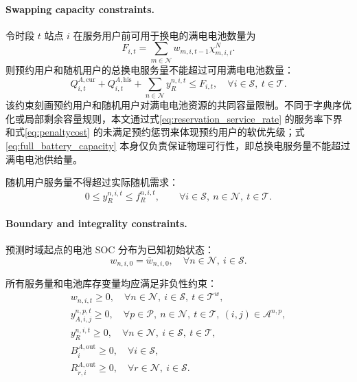 \documentclass[12pt,hyperref,a4paper,UTF8]{ctexart}
\begin{document}
\paragraph{Swapping capacity constraints.}
令时段 $t$ 站点 $i$ 在服务用户前可用于换电的满电电池数量为
\begin{equation}
F_{i,t}=\sum_{m\in\mathcal{N}}w_{m,i,t-1}\chi_{m,i,t}^{N}.
\label{eq:available_full_batteries}
\end{equation}
则预约用户和随机用户的总换电服务量不能超过可用满电电池数量：
\begin{equation}
Q_{i,t}^{A,\mathrm{cur}}+Q_{i,t}^{A,\mathrm{his}}+
\sum_{n\in\mathcal{N}}y_R^{n,i,t}
\le F_{i,t},
\quad \forall i\in\mathcal{S},\ t\in\mathcal{T}.
\label{eq:full_battery_capacity}
\end{equation}
该约束刻画预约用户和随机用户对满电电池资源的共同容量限制。不同于字典序优化或局部剩余容量规则，本文通过式\eqref{eq:reservation_service_rate} 的服务率下界和式\eqref{eq:penaltycost} 的未满足预约惩罚来体现预约用户的软优先级；式\eqref{eq:full_battery_capacity} 本身仅负责保证物理可行性，即总换电服务量不能超过满电电池供给量。

随机用户服务量不得超过实际随机需求：
\begin{equation}
0\le y_R^{n,i,t}\le f_R^{n,i,t},
\qquad
\forall i\in \mathcal{S},\ n\in \mathcal{N},\ t\in \mathcal{T}.
\label{eq:random_bound}
\end{equation}

\paragraph{Boundary and integrality constraints.}
预测时域起点的电池 SOC 分布为已知初始状态：
\begin{equation}
w_{n,i,0}=\bar{w}_{n,i,0},
\quad \forall n\in \mathcal{N},\ i\in \mathcal{S}.
\label{eq:initial_inventory}
\end{equation}

所有服务量和电池库存变量均应满足非负性约束：
\begin{gather}
w_{n,i,t}\ge 0,
\quad \forall n\in \mathcal{N},\ i\in \mathcal{S},\ t\in \mathcal{T}^{w},
\label{eq:nonnegative_w}\\
y_{A,i,j}^{n,p,t}\ge 0,
\quad \forall p\in \mathcal{P},\ n\in \mathcal{N},\ t\in \mathcal{T},\ (i,j)\in \mathcal{A}^{n,p},
\label{eq:nonnegative_a}\\
y_R^{n,i,t}\ge 0,
\quad \forall n\in \mathcal{N},\ i\in \mathcal{S},\ t\in \mathcal{T},
\label{eq:nonnegative_r}\\
B_{i}^{A,\mathrm{out}}\ge 0,
\quad \forall i\in \mathcal{S},
\label{eq:nonnegative_b}\\
R_{r,i}^{A,\mathrm{out}}\ge 0,
\quad \forall r\in \mathcal{N},\ i\in \mathcal{S}.
\label{eq:nonnegative_return}
\end{gather}
\end{document}
